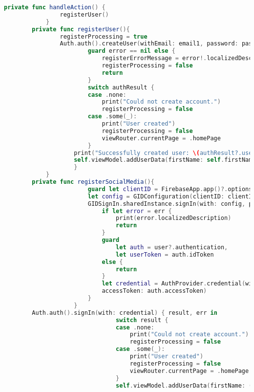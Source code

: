 \hspace{-10mm}
\begin{minipage}{\textwidth}
    \linespread{0.8}\selectfont
    \begin{lstlisting}[language=swift]
        private func handleAction() {
                registerUser()
            }
        private func registerUser(){
                registerProcessing = true
                Auth.auth().createUser(withEmail: email1, password: password1) { authResult, error in
                        guard error == nil else {
                            registerErrorMessage = error!.localizedDescription
                            registerProcessing = false
                            return
                        }     
                        switch authResult {
                        case .none:
                            print("Could not create account.")
                            registerProcessing = false
                        case .some(_):
                            print("User created")
                            registerProcessing = false
                            viewRouter.currentPage = .homePage
                        }
                    print("Successfully created user: \(authResult?.user.uid ?? "")")
                    self.viewModel.addUserData(firstName: self.firstName1, lastName: self.lastName1, email: self.email1, password: self.password1)
                    }
            }      
        private func registerSocialMedia(){
                        guard let clientID = FirebaseApp.app()?.options.clientID else { return }
                        let config = GIDConfiguration(clientID: clientID)
                        GIDSignIn.sharedInstance.signIn(with: config, presenting: getViewController()) { [self] user, err in
                            if let error = err {
                                print(error.localizedDescription)
                                return
                            }
                            guard
                                let auth = user?.authentication,
                                let userToken = auth.idToken
                            else {
                                return
                            }
                            let credential = AuthProvider.credential(withIDToken: userToken,
                            accessToken: auth.accessToken)
                        }
                    }
        Auth.auth().signIn(with: credential) { result, err in
                                switch result {
                                case .none:
                                    print("Could not create account.")
                                    registerProcessing = false
                                case .some(_):
                                    print("User created")
                                    registerProcessing = false
                                    viewRouter.currentPage = .homePage
                                }
                                self.viewModel.addUserData(firstName: (result?.user.firstname)! , lastName: (result?.user.lastname)!, email: (result?.user.email)!, password: result?.user.password)
                                

\end{lstlisting}
\end{minipage}
